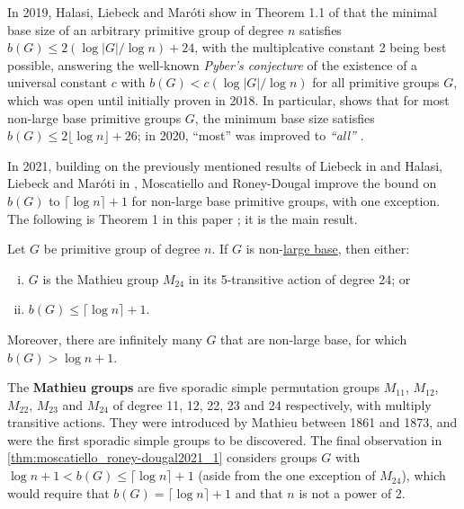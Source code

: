 In 2019, Halasi, Liebeck and Mar\'oti show in Theorem 1.1 of \cite{halasi2019} that the minimal base size of an arbitrary primitive group of degree $n$ satisfies $b(G) \leq 2(\log|G|/\log n) + 24$, with the multiplcative constant 2 being best possible, answering the well-known \textit{Pyber's conjecture} of the existence of a universal constant $c$ with $b(G) < c(\log|G|/\log n)$ for all primitive groups $G$, which was open until initially proven in 2018. In particular, \cite{halasi2019} shows that for most non-large base primitive groups $G$, the minimum base size satisfies $b(G) \leq 2\lfloor\log n\rfloor + 26$; in 2020, ``most'' was improved to \textit{``all''} \cite{moscatiello_roney-dougal2021}.

In 2021, building on the previously mentioned results of Liebeck in \cite{liebeck1984} and Halasi, Liebeck and Mar\'oti in \cite{halasi2019}, Moscatiello and Roney-Dougal improve the bound on $b(G)$ to $\lceil\log n\rceil + 1$ for non-large base primitive groups, with one exception. The following is Theorem 1 in this paper \cite{moscatiello_roney-dougal2021}; it is the main result.

\begin{theorem}\label{thm:moscatiello_roney-dougal2021_1}
    Let $G$ be primitive group of degree $n$. If $G$ is non-\hyperref[def:large_base]{large base}, then either:
    \begin{enumerate}[(i)]
        \item $G$ is the Mathieu group $M_{24}$ in its 5-transitive action of degree 24; or
        \item $b(G) \leq \lceil\log n\rceil + 1$.
    \end{enumerate}
    Moreover, there are infinitely many $G$ that are non-large base, for which $b(G) > \log n + 1$.
\end{theorem}

The \textbf{Mathieu groups} are five sporadic simple permutation groups $M_{11}$, $M_{12}$, $M_{22}$, $M_{23}$ and $M_{24}$ of degree 11, 12, 22, 23 and 24 respectively, with multiply transitive actions. They were introduced by Mathieu between 1861 and 1873, and were the first sporadic simple groups to be discovered. The final observation in \autoref{thm:moscatiello_roney-dougal2021_1} considers groups $G$ with $\log n + 1 < b(G) \leq \lceil\log n\rceil + 1$ (aside from the one exception of $M_{24}$), which would require that $b(G) = \lceil\log n\rceil + 1$ and that $n$ is not a power of 2.

